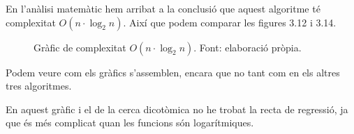 En l'anàlisi matemàtic hem arribat a la conclusió que aquest algoritme té complexitat $O(n \cdot \log_2{n})$. Així que podem comparar les figures 3.12 i 3.14.
\begin{figure}[H]
    \centering
    \caption[Gràfic de complexitat $O(n \cdot \log_2{n})$.]{Gràfic de complexitat $O(n \cdot \log_2{n})$. Font: elaboració pròpia.}
    \label{fig:my_label}
\end{figure}

Podem veure com els gràfics s'assemblen, encara que no tant com en els altres tres algoritmes. 


En aquest gràfic i el de la cerca dicotòmica no he trobat la recta de regressió, ja que és més complicat quan les funcions són logarítmiques.